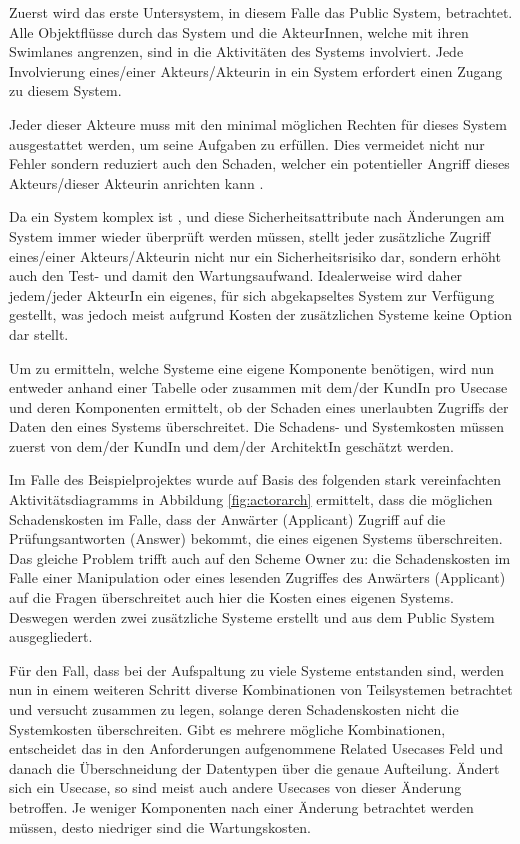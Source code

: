 Zuerst wird das erste Untersystem, in diesem Falle das Public System, betrachtet. Alle Objektflüsse durch das System und die AkteurInnen, welche mit ihren Swimlanes angrenzen, sind in die Aktivitäten des Systems involviert. Jede Involvierung eines/einer Akteurs/Akteurin in ein System erfordert einen Zugang zu diesem System.

Jeder dieser Akteure muss mit den minimal möglichen Rechten für dieses System ausgestattet werden, um seine Aufgaben zu erfüllen. Dies vermeidet nicht nur Fehler sondern reduziert auch den Schaden, welcher ein potentieller Angriff dieses Akteurs/dieser Akteurin anrichten kann \cite[1. A]{leastpriv}.

Da ein System komplex ist \cite[S. 7]{softarch}, und diese Sicherheitsattribute nach Änderungen am System immer wieder überprüft werden müssen, stellt jeder zusätzliche Zugriff eines/einer Akteurs/Akteurin nicht nur ein Sicherheitsrisiko dar, sondern erhöht auch den Test- und damit den Wartungsaufwand. Idealerweise wird daher jedem/jeder AkteurIn ein eigenes, für sich abgekapseltes System zur Verfügung gestellt, was jedoch meist aufgrund Kosten der zusätzlichen Systeme keine Option dar stellt.

Um zu ermitteln, welche Systeme eine eigene Komponente benötigen, wird nun entweder anhand einer Tabelle oder zusammen mit dem/der KundIn pro Usecase und deren Komponenten ermittelt, ob der Schaden eines unerlaubten Zugriffs der Daten den eines Systems überschreitet. Die Schadens- und Systemkosten müssen zuerst von dem/der KundIn und dem/der ArchitektIn geschätzt werden.

Im Falle des Beispielprojektes wurde auf Basis des folgenden stark vereinfachten Aktivitätsdiagramms in Abbildung \ref{fig:actorarch} ermittelt, dass die möglichen Schadenskosten im Falle, dass der Anwärter (Applicant) Zugriff auf die Prüfungsantworten (Answer) bekommt, die eines eigenen Systems überschreiten. Das gleiche Problem trifft auch auf den Scheme Owner zu: die Schadenskosten im Falle einer Manipulation oder eines lesenden Zugriffes des Anwärters (Applicant) auf die Fragen überschreitet auch hier die Kosten eines eigenen Systems. Deswegen werden zwei zusätzliche Systeme erstellt und aus dem Public System ausgegliedert.

Für den Fall, dass bei der Aufspaltung zu viele Systeme entstanden sind, werden nun in einem weiteren Schritt diverse Kombinationen von Teilsystemen betrachtet und versucht zusammen zu legen, solange deren Schadenskosten nicht die Systemkosten überschreiten. Gibt es mehrere mögliche Kombinationen, entscheidet das in den Anforderungen aufgenommene Related Usecases Feld und danach die Überschneidung der Datentypen über die genaue Aufteilung. Ändert sich ein Usecase, so sind meist auch andere Usecases von dieser Änderung betroffen. Je weniger Komponenten nach einer Änderung betrachtet werden müssen, desto niedriger sind die Wartungskosten.

